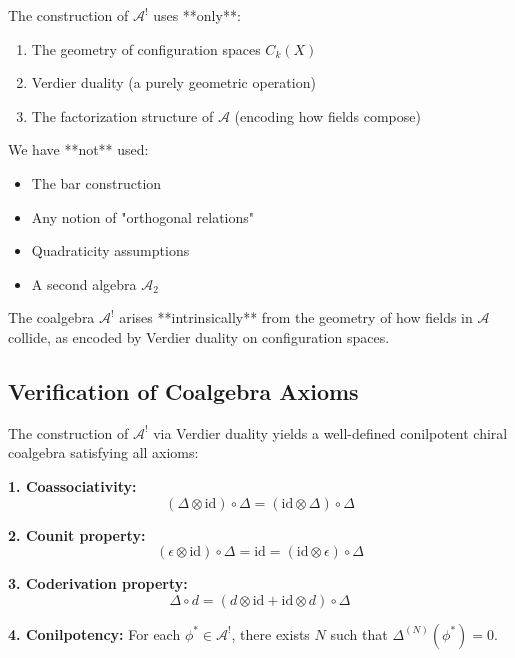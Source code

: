 \begin{remark}\label{rem:intrinsic-nature}
The construction of $\mathcal{A}^!$ uses **only**:
\begin{enumerate}
\item The geometry of configuration spaces $C_k(X)$
\item Verdier duality (a purely geometric operation)
\item The factorization structure of $\mathcal{A}$ (encoding how fields compose)
\end{enumerate}

We have **not** used:
\begin{itemize}
\item The bar construction
\item Any notion of "orthogonal relations"
\item Quadraticity assumptions
\item A second algebra $\mathcal{A}_2$
\end{itemize}

The coalgebra $\mathcal{A}^!$ arises **intrinsically** from the geometry of how fields in $\mathcal{A}$ collide, as encoded by Verdier duality on configuration spaces.
\end{remark}

\subsection{Verification of Coalgebra Axioms}

\begin{theorem}\label{thm:coalgebra-via-NAP}
The construction of $\mathcal{A}^!$ via Verdier duality yields a well-defined conilpotent chiral coalgebra satisfying all axioms:

\textbf{1. Coassociativity:}
$$(\Delta \otimes \text{id}) \circ \Delta = (\text{id} \otimes \Delta) \circ \Delta$$

\textbf{2. Counit property:}
$$(\epsilon \otimes \text{id}) \circ \Delta = \text{id} = (\text{id} \otimes \epsilon) \circ \Delta$$

\textbf{3. Coderivation property:}
$$\Delta \circ d = (d \otimes \text{id} + \text{id} \otimes d) \circ \Delta$$

\textbf{4. Conilpotency:}
For each $\phi^* \in \mathcal{A}^!$, there exists $N$ such that $\Delta^{(N)}(\phi^*) = 0$.
\end{theorem}

